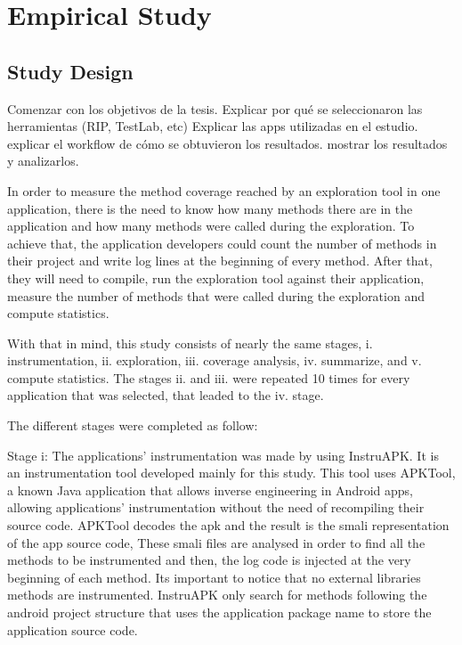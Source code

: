 
\chapter{Empirical Study} %

\label{Chapter5} %

\section{Study Design}

Comenzar con los objetivos de la tesis.
Explicar por qué se seleccionaron las herramientas (RIP, TestLab, etc)
Explicar las apps utilizadas en el estudio.
explicar el workflow de cómo se obtuvieron los resultados.
mostrar los resultados y analizarlos.

In order to measure the method coverage reached by an exploration tool in one application, there is the need to know how many methods there are in the application and how many methods were called during the exploration. To achieve that, the application developers could count the number of methods in their project and write log lines at the beginning of every method. After that, they will need to compile, run the exploration tool against their application, measure the number of methods that were called during the exploration and compute statistics.

With that in mind, this study consists of nearly the same stages, i. instrumentation, ii. exploration, iii. coverage analysis, iv. summarize, and v. compute statistics. The stages ii. and iii. were repeated 10 times for every application that was selected, that leaded to the iv. stage.

The different stages were completed as follow:

Stage i: The applications' instrumentation was made by using InstruAPK. It is an instrumentation tool developed mainly for this study. This tool uses APKTool, a known Java application that allows inverse engineering in Android apps, allowing applications' instrumentation without the need of recompiling their source code. APKTool decodes the apk and the result is the smali representation of the app source code, These smali files are analysed in order to find all the methods to be instrumented and then, the log code is injected at the very beginning of each method. Its important to notice that no external libraries methods are instrumented. InstruAPK only search for methods following the android project structure that uses the application package name to store the application source code.

